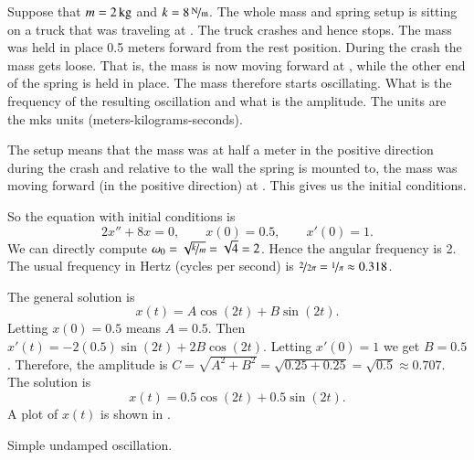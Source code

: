 \begin{example}
Suppose that $m=\unit[2]{kg}$ and $k=\unitfrac[8]{N}{m}$.
The whole mass and spring setup is sitting on
a truck that was traveling at .
The truck crashes and hence stops.
The mass was held in place 0.5 meters forward from the rest position.  During
the crash the mass gets loose.  That is, the mass is now 
moving forward at , while the other end of the
spring is held
in place.  The mass therefore starts oscillating.
What is the frequency of the resulting oscillation and what is the amplitude.
The units are the mks units (meters-kilograms-seconds).

The setup means that the mass was at half a meter in the positive
direction during the crash and
relative to the wall the spring is mounted to, the mass was moving forward
(in the positive direction) at .  This gives us the initial
conditions.

So the equation with initial conditions is
\begin{equation*}
2 x'' + 8 x = 0 , \qquad x(0) = 0.5, \qquad x'(0) = 1.
\end{equation*}
We can directly compute $\omega_0 = \sqrt{\nicefrac{k}{m}} = \sqrt{4} = 2$.
Hence the angular frequency is 2.  The usual frequency in Hertz (cycles per
second) is $\nicefrac{2}{2\pi} = \nicefrac{1}{\pi} \approx 0.318$.

The general solution is
\begin{equation*}
x(t) = A \cos (2t) + B \sin (2t) .
\end{equation*}
Letting $x(0) = 0.5$ means $A = 0.5$.  Then $x'(t) = - 2(0.5) \sin (2t)
+ 2B \cos (2t)$.
Letting $x'(0) = 1$ we get $B = 0.5$.  Therefore, the amplitude is
$C = \sqrt{A^2+B^2} = \sqrt{0.25+0.25} = \sqrt{0.5} \approx 0.707$.  The solution is
\begin{equation*}
x(t) = 0.5 \cos (2t) + 0.5 \sin (2t) .
\end{equation*}
A plot of $x(t)$ is shown in .
\end{example}

\begin{mywrapfig}{3.25in}
\capstart
{}
\caption{Simple undamped oscillation.\label{mv:undampedfig}}
\end{mywrapfig}

